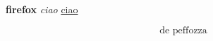 
\textbf{firefox}        
\textit{ciao}
\underline{ciao}

\begin{equation*}
        \mbox{de peffozza} 
\end{equation*}


\begin{align*}

\end{align*}    
